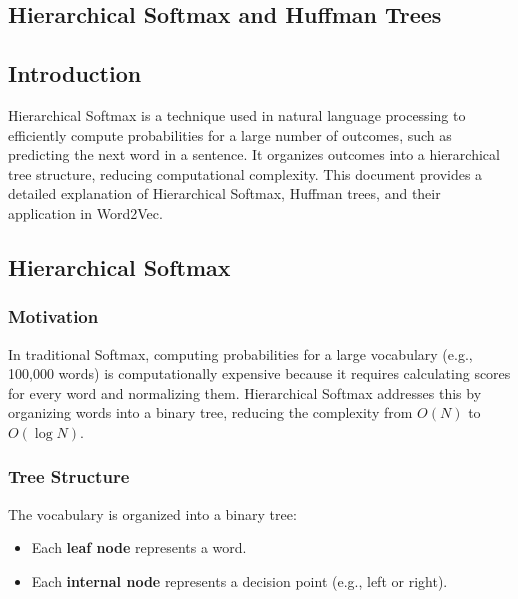 \begin{notechapter}
\chapter{Hierarchical Softmax and Huffman Trees}\label{ch:hierarchical-softmax}

\section{Introduction}
Hierarchical Softmax is a technique used in natural language
processing to efficiently compute probabilities for a large
number of outcomes, such as predicting the next word in a
sentence. It organizes outcomes into a hierarchical tree
structure, reducing computational complexity. This document
provides a detailed explanation of Hierarchical Softmax,
Huffman trees, and their application in Word2Vec.

\section{Hierarchical Softmax}
\subsection{Motivation}
In traditional Softmax, computing probabilities for a large
vocabulary (e.g., 100,000 words) is computationally expensive
because it requires calculating scores for every word and
normalizing them. Hierarchical Softmax addresses this by
organizing words into a binary tree, reducing the complexity
from \( O(N) \) to \( O(\log N) \).

\subsection{Tree Structure}
The vocabulary is organized into a binary tree:
\begin{itemize}
    \item Each \textbf{leaf node} represents a word.
    \item Each \textbf{internal node} represents a decision
          point (e.g., left or right).
\end{itemize}


\end{notechapter}
